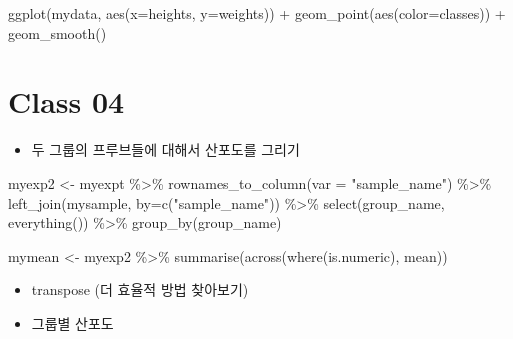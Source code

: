 \documentclass[
]{book}
\newenvironment{Shaded}{\begin{snugshade}}{\end{snugshade}}
\newcommand{\AttributeTok}[1]{\textcolor[rgb]{0.77,0.63,0.00}{#1}}
\newcommand{\FunctionTok}[1]{\textcolor[rgb]{0.00,0.00,0.00}{#1}}
\newcommand{\NormalTok}[1]{#1}
\newcommand{\OtherTok}[1]{\textcolor[rgb]{0.56,0.35,0.01}{#1}}
\newcommand{\SpecialCharTok}[1]{\textcolor[rgb]{0.00,0.00,0.00}{#1}}
\newcommand{\StringTok}[1]{\textcolor[rgb]{0.31,0.60,0.02}{#1}}
\providecommand{\tightlist}{%
  \setlength{\itemsep}{0pt}\setlength{\parskip}{0pt}}
\begin{document}
\begin{Shaded}
\begin{Highlighting}[]

\FunctionTok{ggplot}\NormalTok{(mydata, }\FunctionTok{aes}\NormalTok{(}\AttributeTok{x=}\NormalTok{heights, }\AttributeTok{y=}\NormalTok{weights)) }\SpecialCharTok{+}
  \FunctionTok{geom\_point}\NormalTok{(}\FunctionTok{aes}\NormalTok{(}\AttributeTok{color=}\NormalTok{classes)) }\SpecialCharTok{+}
  \FunctionTok{geom\_smooth}\NormalTok{()}
\end{Highlighting}
\end{Shaded}

\hypertarget{class-04}{%
\section{Class 04}\label{class-04}}

\begin{itemize}
\tightlist
\item
  두 그룹의 프루브들에 대해서 산포도를 그리기
\end{itemize}

\begin{Shaded}
\begin{Highlighting}[]
\NormalTok{myexp2 }\OtherTok{\textless{}{-}}\NormalTok{ myexpt }\SpecialCharTok{\%\textgreater{}\%} 
  \FunctionTok{rownames\_to\_column}\NormalTok{(}\AttributeTok{var =} \StringTok{"sample\_name"}\NormalTok{) }\SpecialCharTok{\%\textgreater{}\%} 
  \FunctionTok{left\_join}\NormalTok{(mysample, }\AttributeTok{by=}\FunctionTok{c}\NormalTok{(}\StringTok{"sample\_name"}\NormalTok{)) }\SpecialCharTok{\%\textgreater{}\%} 
  \FunctionTok{select}\NormalTok{(group\_name, }\FunctionTok{everything}\NormalTok{()) }\SpecialCharTok{\%\textgreater{}\%} 
  \FunctionTok{group\_by}\NormalTok{(group\_name)}

\NormalTok{mymean }\OtherTok{\textless{}{-}}\NormalTok{ myexp2 }\SpecialCharTok{\%\textgreater{}\%} 
  \FunctionTok{summarise}\NormalTok{(}\FunctionTok{across}\NormalTok{(}\FunctionTok{where}\NormalTok{(is.numeric), mean))}
\end{Highlighting}
\end{Shaded}

\begin{itemize}
\tightlist
\item
  transpose (더 효율적 방법 찾아보기)
\item
  그룹별 산포도
\end{itemize}
\end{document}
